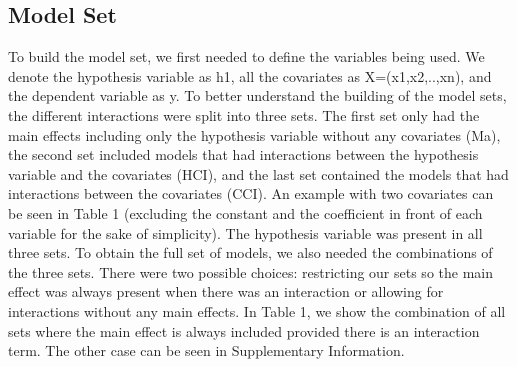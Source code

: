 \subsection{Model Set}
To build the model set, we first needed to define the variables being used. We denote the hypothesis variable as h1, all the covariates as X=(x1,x2,..,xn), and the dependent variable as y. To better understand the building of the model sets, the different interactions were split into three sets. The first set only had the main effects including only the hypothesis variable without any covariates (Ma), the second set included models that had interactions between the hypothesis variable and the covariates (HCI), and the last set contained the models that had interactions between the covariates (CCI). An example with two covariates can be seen in Table 1 (excluding the constant and the coefficient in front of each variable for the sake of simplicity). The hypothesis variable was present in all three sets.
To obtain the full set of models, we also needed the combinations of the three sets. There were two possible choices: restricting our sets so the main effect was always present when there was an interaction or allowing for interactions without any main effects. In Table 1, we show the combination of all sets where the main effect is always included provided there is an interaction term. The other case can be seen in Supplementary Information. \\
\newpage
